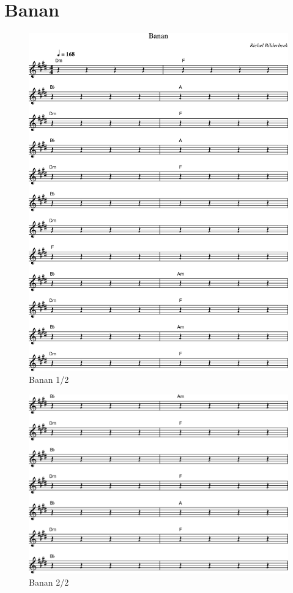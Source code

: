 \chapter{Banan}

%

\begin{figure}[!htbp]
  \includegraphics[width=\textwidth,height=\textheight,keepaspectratio]{../songs/xx_banan-0.png}
  \caption{Banan 1/2}
  \label{fig:xx_banan_1}
\end{figure}

\begin{figure}[!htbp]
  \includegraphics[width=\textwidth,height=\textheight,keepaspectratio]{../songs/xx_banan-1.png}
  \caption{Banan 2/2}
  \label{fig:xx_banan_2}
\end{figure}
